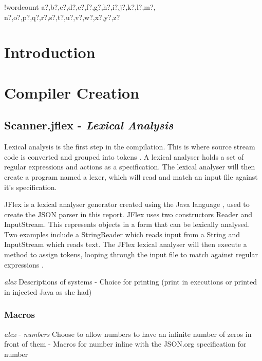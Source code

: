 \documentclass[fontsize=10pt]{extarticle}
\numberwithin{figure}{section} %
\newcounter{words}
\newenvironment{counted}{%
  \setcounter{words}{0}
  \SearchList!{wordcount}{\stepcounter{words}}
    {a?,b?,c?,d?,e?,f?,g?,h?,i?,j?,k?,l?,m?,
    n?,o?,p?,q?,r?,s?,t?,u?,v?,w?,x?,y?,z?}
  \UndoBoundary{'}
  \SearchOrder{p;}}{%
  \StopSearching}
\begin{document}
\clearpage
{}
\begin{counted} %
\section{Introduction}\label{introduction}

\section{Compiler Creation}\label{compiler-creation}

\subsection{\texorpdfstring{Scanner.jflex - \emph{Lexical
Analysis}}{Scanner.jflex - Lexical Analysis}}\label{scanner.jflex---lexical-analysis}

Lexical analysis is the first step in the compilation. This is where
source stream code is converted and grouped into tokens
\cite{lexicalAna}. A lexical analyser holds a set of regular expressions
and actions as a specification. The lexical analyser will then create a
program named a lexer, which will read and match an input file against
it's specification.

JFlex is a lexical analyser generator created using the Java language
\cite{JFlexJFl92:online}, used to create the JSON parser in this report.
JFlex uses two constructors Reader and InputStream. This represents
objects in a form that can be lexically analysed. Two examples include a
StringReader which reads input from a String and InputStream which reads
text. The JFlex lexical analyser will then execute a method to assign
tokens, looping through the input file to match against regular
expressions \cite{lexicalAna}.

\emph{alex} Descriptions of systems - Choice for printing (print in
executions or printed in injected Java as she had)

\subsubsection{Macros}\label{macros}

\emph{alex} - \emph{numbers} Choose to allow numbers to have an infinite
number of zeros in front of them - Macros for number inline with the
JSON.org specification for number


\end{counted}
\end{document}
